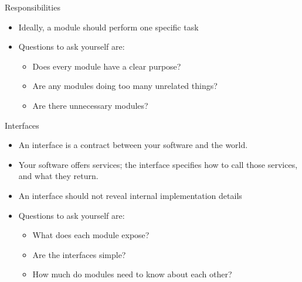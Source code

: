 \documentclass[
ps,
]{prosper}
\begin{document}
\begin{slide}{Responsibilities}

\begin{itemize}

\item Ideally, a module should perform one specific task

\item Questions to ask yourself are:

  \begin{itemize}
  
  \item Does every module have a clear purpose?

  \item Are any modules doing too many unrelated things?

  \item Are there unnecessary modules?
    
  \end{itemize}

\end{itemize}
  
\end{slide}



\begin{slide}{Interfaces}

\begin{itemize}

\item An interface is a contract between your software and the world.

\item Your software offers services; the interface specifies how to call those services, and what they return.

\item An interface should not reveal internal implementation details

\item Questions to ask yourself are:

  \begin{itemize}
  
  \item What does each module expose?

  \item Are the interfaces simple?

  \item How much do modules need to know about each other?
    
  \end{itemize}

\end{itemize}
  
\end{slide}
\end{document}
